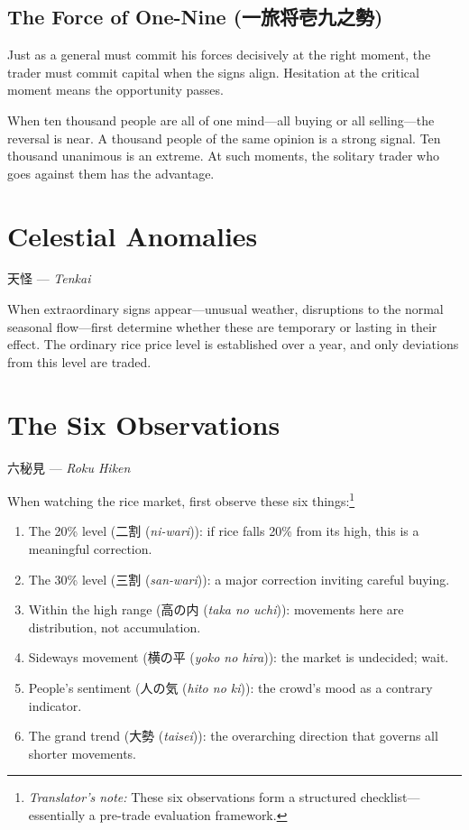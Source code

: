 \documentclass[10pt, openany]{book}
\newcommand{\jp}[1]{{\japanesefont #1}}
\newcommand{\tn}[1]{\footnote{\textit{Translator's note:} #1}}
\newcommand{\jt}[2]{\jp{#1} (\textit{#2})}
\begin{document}
\subsection{The Force of One-Nine (\jp{一旅将壱九之勢})}

Just as a general must commit his forces decisively at the right moment, the
trader must commit capital when the signs align. Hesitation at the critical
moment means the opportunity passes.

When ten thousand people are all of one mind---all buying or all
selling---the reversal is near. A thousand people of the same opinion is a
strong signal. Ten thousand unanimous is an extreme. At such moments, the
solitary trader who goes against them has the advantage.

\section{Celestial Anomalies}

\begin{center}
\jp{天怪} --- \textit{Tenkai}
\end{center}

\vspace{0.5em}

When extraordinary signs appear---unusual weather, disruptions to the normal
seasonal flow---first determine whether these are temporary or lasting in
their effect. The ordinary rice price level is established over a year, and
only deviations from this level are traded.

\section{The Six Observations}

\begin{center}
\jp{六秘見} --- \textit{Roku Hiken}
\end{center}

\vspace{0.5em}

When watching the rice market, first observe these six
things:\tn{These six observations form a structured checklist---essentially
a pre-trade evaluation framework.}

\begin{enumerate}[leftmargin=2em]
\item The 20\% level (\jt{二割}{ni-wari}): if rice falls 20\% from its
  high, this is a meaningful correction.
\item The 30\% level (\jt{三割}{san-wari}): a major correction inviting
  careful buying.
\item Within the high range (\jt{高の内}{taka no uchi}): movements here
  are distribution, not accumulation.
\item Sideways movement (\jt{横の平}{yoko no hira}): the market is
  undecided; wait.
\item People's sentiment (\jt{人の気}{hito no ki}): the crowd's mood
  as a contrary indicator.
\item The grand trend (\jt{大勢}{taisei}): the overarching direction
  that governs all shorter movements.
\end{enumerate}
\end{document}
